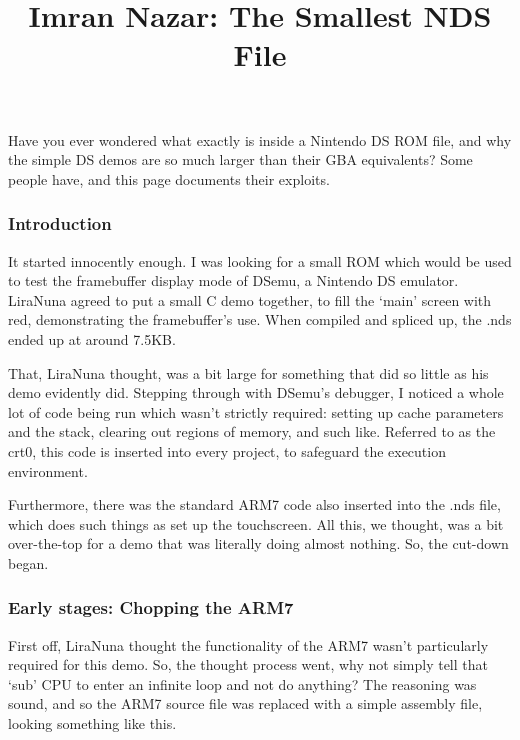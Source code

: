 \documentclass[11pt,a4paper]{article}
\title{Imran Nazar: The Smallest NDS File}
\date{}
\begin{document}
\maketitle

\newpage
\obeyspaces

\hypertarget{wrapper}{}
\hypertarget{head}{}

\hypertarget{container}{}
\hypertarget{content}{}
Have you ever wondered what exactly is inside a Nintendo DS ROM file,
and why the simple DS demos are so much larger than their GBA
equivalents? Some people have, and this page documents their exploits.

\subsubsection{Introduction}\label{introduction}

It started innocently enough. I was looking for a small ROM which would
be used to test the framebuffer display mode of DSemu, a Nintendo DS
emulator. LiraNuna agreed to put a small C demo together, to fill the
`main' screen with red, demonstrating the framebuffer's use. When
compiled and spliced up, the .nds ended up at around 7.5KB.

That, LiraNuna thought, was a bit large for something that did so little
as his demo evidently did. Stepping through with DSemu's debugger, I
noticed a whole lot of code being run which wasn't strictly required:
setting up cache parameters and the stack, clearing out regions of
memory, and such like. Referred to as the crt0, this code is inserted
into every project, to safeguard the execution environment.

Furthermore, there was the standard ARM7 code also inserted into the
.nds file, which does such things as set up the touchscreen. All this,
we thought, was a bit over-the-top for a demo that was literally doing
almost nothing. So, the cut-down began.

\subsubsection{Early stages: Chopping the
ARM7}\label{early-stages-chopping-the-arm7}

First off, LiraNuna thought the functionality of the ARM7 wasn't
particularly required for this demo. So, the thought process went, why
not simply tell that `sub' CPU to enter an infinite loop and not do
anything? The reasoning was sound, and so the ARM7 source file was
replaced with a simple assembly file, looking something like this.
\end{document}
